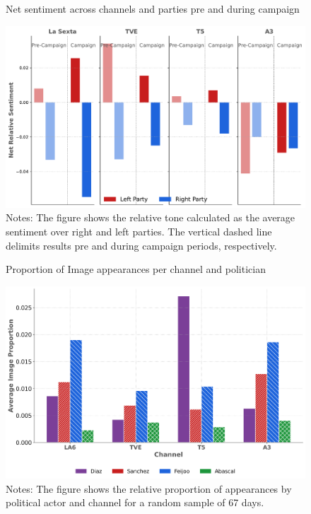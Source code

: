 \documentclass[12pt]{article}
\begin{document}
	\begin{figure}[!htb]
		\caption{Net sentiment across channels and parties pre and during campaign }
		\centering
		\includegraphics[width=150mm]{figures/average_tone_pre_post_election}
		\caption*{\small Notes: The figure shows the relative tone calculated as the average sentiment over right and left parties. The vertical dashed line delimits results pre and during campaign periods, respectively. }
		\label{fig:tone2}
	\end{figure}
	
	
	
	
		\begin{figure}[!htb]
		\caption{Proportion of Image appearances per channel and politician}
		\centering
		\includegraphics[width=150mm]{figures/politicians_image_proportions}
		\caption*{\small Notes: The figure shows the relative proportion of appearances by political actor and channel for a random sample of 67 days. }
		\label{fig:image_channel}
	\end{figure}
	
\end{document}
